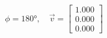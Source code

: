 \documentclass[preview]{standalone}
\begin{document}
\begin{align*}
\phi = 180°, \quad \vec{v} = \begin{bmatrix} 1.000 \\ 0.000 \\ 0.000 \end{bmatrix}
\end{align*}
\end{document}
